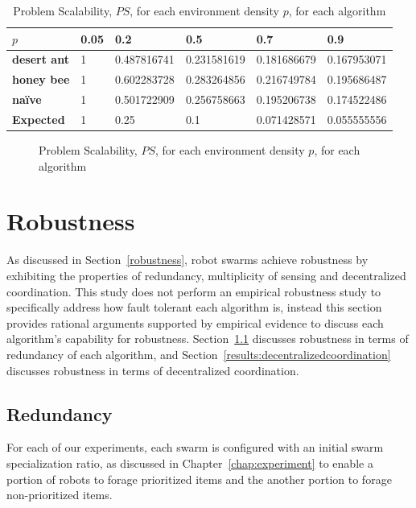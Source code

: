 \begin{table}[]
\centering
\caption{Problem Scalability, $PS$, for each environment density $p$, for each algorithm}
\label{table:problemscalability}
\begin{tabular}{@{}llllll@{}}
\toprule
\textbf{$p$}                  & \textbf{0.05} & \textbf{0.2        } & \textbf{0.5}         & \textbf{0.7}         & \textbf{0.9}         \\ \midrule
\textbf{desert ant}           & 1    & 0.487816741 & 0.231581619 & 0.181686679 & 0.167953071 \\
\textbf{honey bee}            & 1    & 0.602283728 & 0.283264856 & 0.216749784 & 0.195686487 \\
\textbf{na\"ive}              & 1    & 0.501722909 & 0.256758663 & 0.195206738 & 0.174522486 \\
\textbf{Expected} & 1    & 0.25        & 0.1         & 0.071428571 & 0.055555556 \\ \bottomrule
\end{tabular}
\end{table}

\begin{figure}[!htb]
\centering
\resizebox{\textwidth}{!}{}
\caption{Problem Scalability, $PS$, for each environment density $p$, for each algorithm}
\label{fig:problemscalability}
\end{figure}

\section{Robustness}
\label{results:robustness}
As discussed in Section~\ref{robustness}, robot swarms achieve robustness by exhibiting the properties of redundancy, multiplicity of sensing and decentralized coordination. This study does not perform an empirical robustness study to specifically address how fault tolerant each algorithm is, instead this section provides rational arguments supported by empirical evidence to discuss each  algorithm's capability for robustness. Section~\ref{results:redundancy} discusses robustness in terms of redundancy of each algorithm, and Section~\ref{results:decentralizedcoordination} discusses robustness in terms of decentralized coordination.

\subsection{Redundancy}
\label{results:redundancy}
For each of our experiments, each swarm is configured with an initial swarm specialization ratio, as discussed in Chapter~\ref{chap:experiment} to enable a portion of robots to forage prioritized items and the another portion to forage non-prioritized items. 

